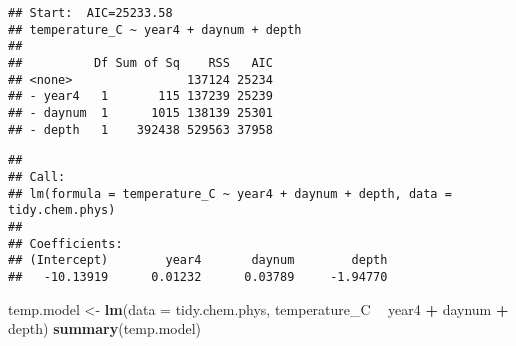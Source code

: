 \documentclass[]{article}
\newenvironment{Shaded}{\begin{snugshade}}{\end{snugshade}}
\newcommand{\KeywordTok}[1]{\textcolor[rgb]{0.13,0.29,0.53}{\textbf{#1}}}
\newcommand{\DataTypeTok}[1]{\textcolor[rgb]{0.13,0.29,0.53}{#1}}
\newcommand{\DecValTok}[1]{\textcolor[rgb]{0.00,0.00,0.81}{#1}}
\newcommand{\StringTok}[1]{\textcolor[rgb]{0.31,0.60,0.02}{#1}}
\newcommand{\CommentTok}[1]{\textcolor[rgb]{0.56,0.35,0.01}{\textit{#1}}}
\newcommand{\OperatorTok}[1]{\textcolor[rgb]{0.81,0.36,0.00}{\textbf{#1}}}
\newcommand{\NormalTok}[1]{#1}
\begin{document}
\begin{Shaded}
\end{Shaded}

\begin{verbatim}
## Start:  AIC=25233.58
## temperature_C ~ year4 + daynum + depth
## 
##          Df Sum of Sq    RSS   AIC
## <none>                137124 25234
## - year4   1       115 137239 25239
## - daynum  1      1015 138139 25301
## - depth   1    392438 529563 37958
\end{verbatim}

\begin{verbatim}
## 
## Call:
## lm(formula = temperature_C ~ year4 + daynum + depth, data = tidy.chem.phys)
## 
## Coefficients:
## (Intercept)        year4       daynum        depth  
##   -10.13919      0.01232      0.03789     -1.94770
\end{verbatim}

\begin{Shaded}
\begin{Highlighting}[]
\NormalTok{temp.model <-}\StringTok{ }\KeywordTok{lm}\NormalTok{(}\DataTypeTok{data =}\NormalTok{ tidy.chem.phys, temperature_C }\OperatorTok{~}\StringTok{ }\NormalTok{year4 }\OperatorTok{+}\StringTok{ }\NormalTok{daynum }\OperatorTok{+}\StringTok{ }\NormalTok{depth)}
\KeywordTok{summary}\NormalTok{(temp.model)}
\end{Highlighting}
\end{Shaded}
\end{document}
